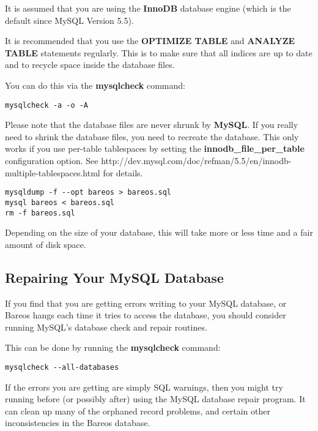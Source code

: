 It is assumed that you are using the {\bf InnoDB} database engine (which is the default since MySQL Version 5.5).

It is recommended that you use the {\bf OPTIMIZE TABLE} and {\bf ANALYZE TABLE}
statements regularly. This is to make sure that all indices are up to date
and to recycle space inside the database files.


You can do this via the {\bf mysqlcheck} command:
\footnotesize
\begin{verbatim}
mysqlcheck -a -o -A
\end{verbatim}
\normalsize

Please note that the database files are never shrunk by {\bf MySQL}. If you really need to shrink the database files, you need to recreate the database. This only works if you use per-table tablespaces by setting the {\bf innodb\_file\_per\_table} configuration option.
See
{http://dev.mysql.com/doc/refman/5.5/en/innodb-multiple-tablespaces.html} for details.

\footnotesize
\begin{verbatim}
mysqldump -f --opt bareos > bareos.sql
mysql bareos < bareos.sql
rm -f bareos.sql
\end{verbatim}
\normalsize

Depending on the size of your database, this will take more or less time and a
fair amount of disk space.

\label{DatabaseRepair}
\label{RepairingMySQL}
\subsection{Repairing Your MySQL Database}

If you find that you are getting errors writing to your MySQL database, or
Bareos hangs each time it tries to access the database, you should consider
running MySQL's database check and repair routines.

This can be done by running the {\bf mysqlcheck } command:
\footnotesize
\begin{verbatim}
mysqlcheck --all-databases
\end{verbatim}
\normalsize

If the errors you are getting are simply SQL warnings, then you might try
running  before (or possibly after) using the MySQL database repair
program. It can clean up many of the orphaned record problems, and certain
other inconsistencies in the Bareos database.

